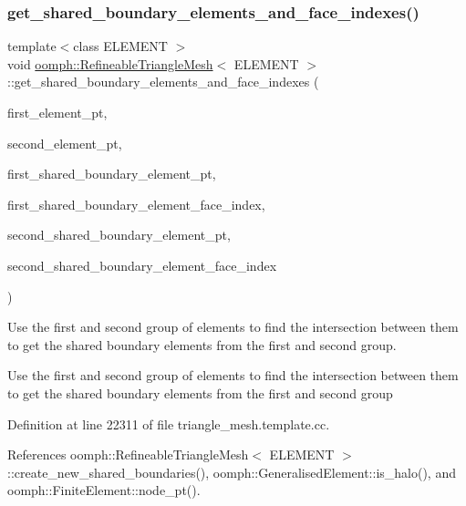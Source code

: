 \subsubsection{\texorpdfstring{get\+\_\+shared\+\_\+boundary\+\_\+elements\+\_\+and\+\_\+face\+\_\+indexes()}{get\_shared\_boundary\_elements\_and\_face\_indexes()}}
{\footnotesize\ttfamily template$<$class E\+L\+E\+M\+E\+NT $>$ \\
void \hyperlink{classoomph_1_1RefineableTriangleMesh}{oomph\+::\+Refineable\+Triangle\+Mesh}$<$ E\+L\+E\+M\+E\+NT $>$\+::get\+\_\+shared\+\_\+boundary\+\_\+elements\+\_\+and\+\_\+face\+\_\+indexes (\begin{DoxyParamCaption}\item[{const \hyperlink{classoomph_1_1Vector}{Vector}$<$ \hyperlink{classoomph_1_1FiniteElement}{Finite\+Element} $\ast$$>$ \&}]{first\+\_\+element\+\_\+pt,  }\item[{const \hyperlink{classoomph_1_1Vector}{Vector}$<$ \hyperlink{classoomph_1_1FiniteElement}{Finite\+Element} $\ast$$>$ \&}]{second\+\_\+element\+\_\+pt,  }\item[{\hyperlink{classoomph_1_1Vector}{Vector}$<$ \hyperlink{classoomph_1_1FiniteElement}{Finite\+Element} $\ast$$>$ \&}]{first\+\_\+shared\+\_\+boundary\+\_\+element\+\_\+pt,  }\item[{\hyperlink{classoomph_1_1Vector}{Vector}$<$ unsigned $>$ \&}]{first\+\_\+shared\+\_\+boundary\+\_\+element\+\_\+face\+\_\+index,  }\item[{\hyperlink{classoomph_1_1Vector}{Vector}$<$ \hyperlink{classoomph_1_1FiniteElement}{Finite\+Element} $\ast$$>$ \&}]{second\+\_\+shared\+\_\+boundary\+\_\+element\+\_\+pt,  }\item[{\hyperlink{classoomph_1_1Vector}{Vector}$<$ unsigned $>$ \&}]{second\+\_\+shared\+\_\+boundary\+\_\+element\+\_\+face\+\_\+index }\end{DoxyParamCaption})}



Use the first and second group of elements to find the intersection between them to get the shared boundary elements from the first and second group. 

Use the first and second group of elements to find the intersection between them to get the shared boundary elements from the first and second group 

Definition at line 22311 of file triangle\+\_\+mesh.\+template.\+cc.



References oomph\+::\+Refineable\+Triangle\+Mesh$<$ E\+L\+E\+M\+E\+N\+T $>$\+::create\+\_\+new\+\_\+shared\+\_\+boundaries(), oomph\+::\+Generalised\+Element\+::is\+\_\+halo(), and oomph\+::\+Finite\+Element\+::node\+\_\+pt().



